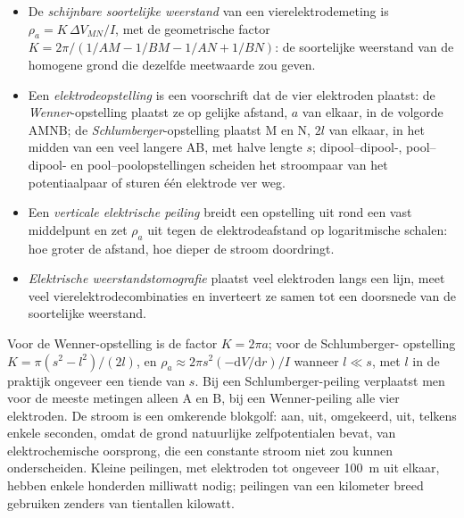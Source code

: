 \begin{definition}\label{def:b3:field-lab-methods-3:resistivity}
\leavevmode
\begin{itemize}
  \item De \emph{schijnbare soortelijke weerstand} van een
        vierelektrodemeting is $\rho_a = K\,\Delta V_{MN}/I$, met
        de geometrische factor $K = 2\pi/(1/AM - 1/BM - 1/AN + 1/BN)$: de
        soortelijke weerstand van de homogene grond die dezelfde
        meetwaarde zou geven.
  \item Een \emph{elektrodeopstelling} is een voorschrift dat
        de vier elektroden plaatst: de \emph{Wenner}-opstelling plaatst ze
        op gelijke afstand, $a$ van elkaar, in de volgorde AMNB; de
        \emph{Schlumberger}-opstelling plaatst M en N, $2l$ van elkaar, in het
        midden van een veel langere AB, met halve lengte $s$; dipool--dipool-,
        pool--dipool- en pool--poolopstellingen scheiden het stroompaar
        van het potentiaalpaar of sturen één elektrode ver weg.
  \item Een \emph{verticale elektrische peiling}
        breidt een opstelling uit rond een vast middelpunt en zet
        $\rho_a$ uit tegen de elektrodeafstand op logaritmische schalen: hoe
        groter de afstand, hoe dieper de stroom doordringt.
  \item \emph{Elektrische weerstandstomografie}
        plaatst veel elektroden langs een lijn,
        meet veel vierelektrodecombinaties en inverteert ze
        samen tot een doorsnede van de soortelijke weerstand.
\end{itemize}
\end{definition}

Voor de Wenner-opstelling is de factor $K = 2\pi a$; voor de Schlumberger-
opstelling $K = \pi(s^2 - l^2)/(2l)$, en $\rho_a \approx 2\pi s^2(-\mathrm{d}V/
\mathrm{d}r)/I$ wanneer $l \ll s$, met $l$ in de praktijk
ongeveer een tiende van $s$. Bij een Schlumberger-peiling verplaatst men voor de meeste metingen alleen A en B,
bij een Wenner-peiling alle vier elektroden. De stroom is een omkerende
blokgolf: aan, uit, omgekeerd, uit, telkens enkele seconden, omdat de grond
natuurlijke zelfpotentialen bevat, van elektrochemische oorsprong, die een
constante stroom niet zou kunnen onderscheiden. Kleine peilingen, met
elektroden tot ongeveer \qty{100}{m} uit elkaar, hebben enkele honderden
milliwatt nodig; peilingen van een kilometer breed gebruiken zenders van tientallen
kilowatt.


